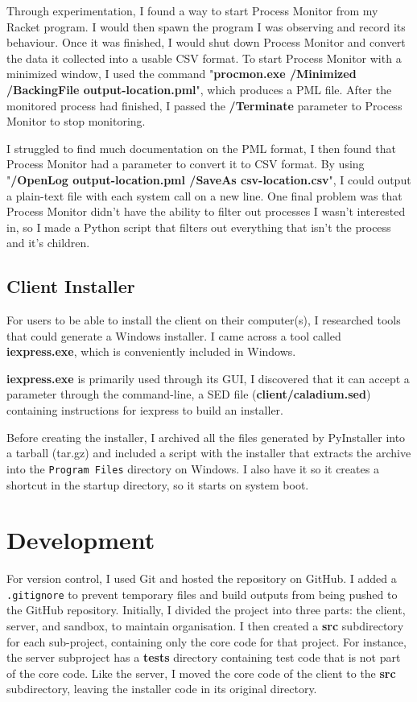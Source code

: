 Through experimentation, I found a way to start
Process Monitor from my Racket program.
I would then spawn the program I was observing and record its behaviour.
Once it was finished, I would shut down Process Monitor
and convert the data it collected into a usable CSV format.
To start Process Monitor with a minimized window,
I used the command
"\textbf{procmon.exe /Minimized /BackingFile output-location.pml}",
which produces a PML file. After the monitored process had finished,
I passed the \textbf{/Terminate} parameter to Process Monitor to stop monitoring.

I struggled to find much documentation on the PML format,
I then found that Process Monitor had a parameter to convert it to CSV format.
By using "\textbf{/OpenLog output-location.pml /SaveAs csv-location.csv}",
I could output a plain-text file with each system call on a new line.
One final problem was that Process Monitor didn't have the ability
to filter out processes I wasn't interested in,
so I made a Python script that filters out everything that
isn't the process and it's children.

\subsection{Client Installer}
For users to be able to install the client on their computer(s),
I researched tools that could generate a Windows installer.
I came across a tool called \textbf{iexpress.exe},
which is conveniently included in Windows.

\textbf{iexpress.exe} is primarily used through its GUI,
I discovered that it can accept a parameter through the command-line,
a SED file (\textbf{client/caladium.sed})
containing instructions for iexpress to build an installer.

Before creating the installer,
I archived all the files generated by PyInstaller into a tarball (tar.gz)
and included a script with the installer that
extracts the archive into the \texttt{Program Files} directory on Windows.
I also have it so it creates a shortcut in the startup directory,
so it starts on system boot.

\section{Development}
For version control, I used Git and hosted the repository on GitHub.
I added a \texttt{.gitignore} to prevent temporary files
and build outputs from being pushed to the GitHub repository.
Initially, I divided the project into
three parts: the client, server, and sandbox,
to maintain organisation. I then created a \textbf{src} subdirectory
for each sub-project, containing only the core code for that project.
For instance, the server subproject has a \textbf{tests} directory
containing test code that is not part of the core code.
Like the server, I moved the core code of the client to the
\textbf{src} subdirectory, leaving
the installer code in its original directory.

